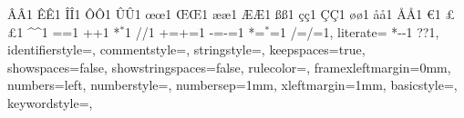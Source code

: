 {    {Â}{{\^A}}1 {Ê}{{\^E}}1 {Î}{{\^I}}1 {Ô}{{\^O}}1 {Û}{{\^U}}1
    {œ}{{\oe}}1 {Œ}{{\OE}}1 {æ}{{\ae}}1 {Æ}{{\AE}}1 {ß}{{\ss}}1
    {ç}{{\c c}}1 {Ç}{{\c C}}1 {ø}{{\o}}1 {å}{{\r a}}1 {Å}{{\r A}}1
    {€}{{\EUR}}1 {£}{{\pounds}}1
    {^}{{{\color{ipython_purple}\^{}}}}1
    {=}{{{\color{ipython_purple}=}}}1
    {+}{{{\color{ipython_purple}+}}}1
    {*}{{{\color{ipython_purple}$^\ast$}}}1
    {/}{{{\color{ipython_purple}/}}}1
    {+=}{{{+=}}}1
    {-=}{{{-=}}}1
    {*=}{{{$^\ast$=}}}1
    {/=}{{{/=}}}1,
    literate=
    *{-}{{{\color{ipython_purple}-}}}1
     {?}{{{\color{ipython_purple}?}}}1,
    identifierstyle=\color{black}\ttfamily,
    commentstyle=\color{ipython_cyan}\ttfamily,
    stringstyle=\color{ipython_red}\ttfamily,
    keepspaces=true,
    showspaces=false,
    showstringspaces=false,
    rulecolor=\color{ipython_frame},
    framexleftmargin=0mm,
    numbers=left,
    numberstyle=\tiny\color{halfgray},
    numbersep=1mm,
    xleftmargin=1mm,
    basicstyle=\scriptsize,
    keywordstyle=\color{ipython_green}\ttfamily,
}



